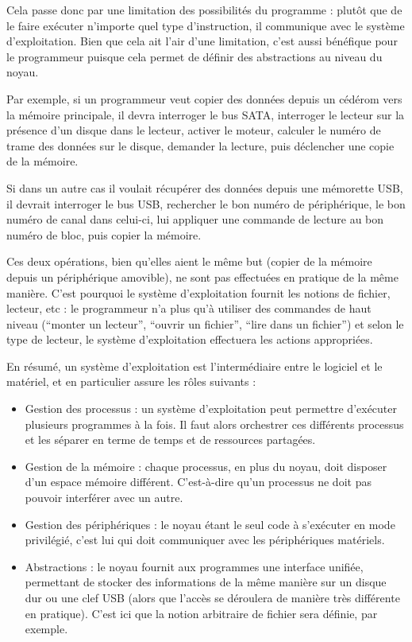 Cela passe donc par une limitation des possibilités du programme : plutôt que de
le faire exécuter n'importe quel type d'instruction, il communique avec le
système d'exploitation. Bien que cela ait l'air d'une limitation, c'est aussi
bénéfique pour le programmeur puisque cela permet de définir des abstractions au
niveau du noyau.

Par exemple, si un programmeur veut copier des données depuis un cédérom vers la
mémoire principale, il devra interroger le bus SATA, interroger le lecteur sur
la présence d'un disque dans le lecteur, activer le moteur, calculer le numéro
de trame des données sur le disque, demander la lecture, puis déclencher une
copie de la mémoire.

Si dans un autre cas il voulait récupérer des données depuis une mémorette USB,
il devrait interroger le bus USB, rechercher le bon numéro de périphérique, le
bon numéro de canal dans celui-ci, lui appliquer une commande de lecture au bon
numéro de bloc, puis copier la mémoire.

Ces deux opérations, bien qu'elles aient le même but (copier de la mémoire
depuis un périphérique amovible), ne sont pas effectuées en pratique de la même
manière. C'est pourquoi le système d'exploitation fournit les notions de
fichier, lecteur, etc : le programmeur n'a plus qu'à utiliser des commandes de
haut niveau (``monter un lecteur'', ``ouvrir un fichier'', ``lire dans un
fichier'') et selon le type de lecteur, le système d'exploitation effectuera les
actions appropriées.

En résumé, un système d'exploitation est l'intermédiaire entre le logiciel et
le matériel, et en particulier assure les rôles suivants :

\begin{itemize}
\item
  Gestion des processus : un système d'exploitation peut permettre
  d'exécuter plusieurs programmes à la fois. Il faut alors orchestrer
  ces différents processus et les séparer en terme de temps et de
  ressources partagées.
\item
  Gestion de la mémoire : chaque processus, en plus du noyau, doit
  disposer d'un espace mémoire différent. C'est-à-dire qu'un processus
  ne doit pas pouvoir interférer avec un autre.
\item
  Gestion des périphériques : le noyau étant le seul code à s'exécuter
  en mode privilégié, c'est lui qui doit communiquer avec les
  périphériques matériels.
\item
  Abstractions : le noyau fournit aux programmes une interface unifiée,
  permettant de stocker des informations de la même manière sur un
  disque dur ou une clef USB (alors que l'accès se déroulera de manière
  très différente en pratique). C'est ici que la notion arbitraire de
  fichier sera définie, par exemple.
\end{itemize}


